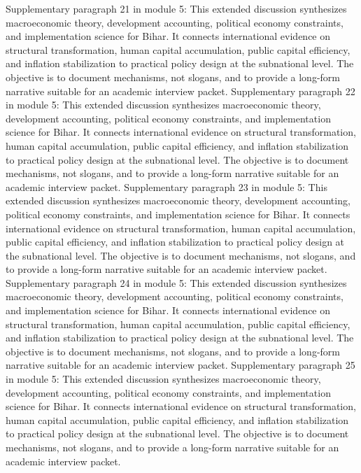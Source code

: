 \documentclass[preprint,12pt]{elsarticle}
\begin{document}
Supplementary paragraph 21 in module 5: This extended discussion synthesizes macroeconomic theory, development accounting, political economy constraints, and implementation science for Bihar. It connects international evidence on structural transformation, human capital accumulation, public capital efficiency, and inflation stabilization to practical policy design at the subnational level. The objective is to document mechanisms, not slogans, and to provide a long-form narrative suitable for an academic interview packet.
Supplementary paragraph 22 in module 5: This extended discussion synthesizes macroeconomic theory, development accounting, political economy constraints, and implementation science for Bihar. It connects international evidence on structural transformation, human capital accumulation, public capital efficiency, and inflation stabilization to practical policy design at the subnational level. The objective is to document mechanisms, not slogans, and to provide a long-form narrative suitable for an academic interview packet.
Supplementary paragraph 23 in module 5: This extended discussion synthesizes macroeconomic theory, development accounting, political economy constraints, and implementation science for Bihar. It connects international evidence on structural transformation, human capital accumulation, public capital efficiency, and inflation stabilization to practical policy design at the subnational level. The objective is to document mechanisms, not slogans, and to provide a long-form narrative suitable for an academic interview packet.
Supplementary paragraph 24 in module 5: This extended discussion synthesizes macroeconomic theory, development accounting, political economy constraints, and implementation science for Bihar. It connects international evidence on structural transformation, human capital accumulation, public capital efficiency, and inflation stabilization to practical policy design at the subnational level. The objective is to document mechanisms, not slogans, and to provide a long-form narrative suitable for an academic interview packet.
Supplementary paragraph 25 in module 5: This extended discussion synthesizes macroeconomic theory, development accounting, political economy constraints, and implementation science for Bihar. It connects international evidence on structural transformation, human capital accumulation, public capital efficiency, and inflation stabilization to practical policy design at the subnational level. The objective is to document mechanisms, not slogans, and to provide a long-form narrative suitable for an academic interview packet.
\end{document}
